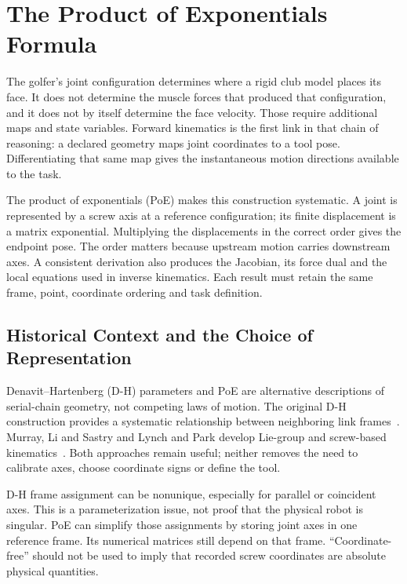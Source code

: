 \chapter[The Product of Exponentials Formula]{The Product of Exponentials\\Formula}
\label{ch:poe}

The golfer's joint configuration determines where a rigid club model places its face. It does not determine the muscle forces that produced that configuration, and it does not by itself determine the face velocity. Those require additional maps and state variables. Forward kinematics is the first link in that chain of reasoning: a declared geometry maps joint coordinates to a tool pose. Differentiating that same map gives the instantaneous motion directions available to the task.

The product of exponentials (PoE) makes this construction systematic. A joint is represented by a screw axis at a reference configuration; its finite displacement is a matrix exponential. Multiplying the displacements in the correct order gives the endpoint pose. The order matters because upstream motion carries downstream axes. A consistent derivation also produces the Jacobian, its force dual and the local equations used in inverse kinematics. Each result must retain the same frame, point, coordinate ordering and task definition.

\section{Historical Context and the Choice of Representation}
\label{sec:poe_history}
\label{laymans:context_box}

Denavit--Hartenberg (D-H) parameters and PoE are alternative descriptions of serial-chain geometry, not competing laws of motion. The original D-H construction provides a systematic relationship between neighboring link frames~\cite{dh1955}. Murray, Li and Sastry and Lynch and Park develop Lie-group and screw-based kinematics~\cite{Murray1994,Lynch2017}. Both approaches remain useful; neither removes the need to calibrate axes, choose coordinate signs or define the tool.

D-H frame assignment can be nonunique, especially for parallel or coincident axes. This is a parameterization issue, not proof that the physical robot is singular. PoE can simplify those assignments by storing joint axes in one reference frame. Its numerical matrices still depend on that frame. ``Coordinate-free'' should not be used to imply that recorded screw coordinates are absolute physical quantities.

